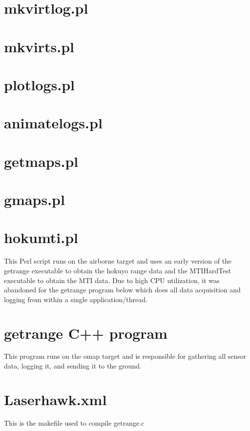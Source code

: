\documentclass[a4paper,11pt]{report}
\begin{document}
\lstset{caption=}

\section{mkvirtlog.pl}

\section{mkvirts.pl}

\section{plotlogs.pl}

\section{animatelogs.pl}

\section{getmaps.pl}

\section{gmaps.pl}

\section{hokumti.pl}
This Perl script runs on the airborne target and uses an early version of the getrange executable to obtain the hokuyo range data and the MTIHardTest executable to obtain the MTI data. Due to high CPU utilization, it was abandoned for the getrange program below which does all data acquisition and logging from within a single application/thread.


\lstset{language=C++}
\section{getrange C++ program}
This program runs on the omap target and is responsible for gathering all sensor data, logging it, and sending it to the ground.


\lstset{language=make}
\section{Laserhawk.xml}
This is the makefile used to compile getrange.c

\end{document}
